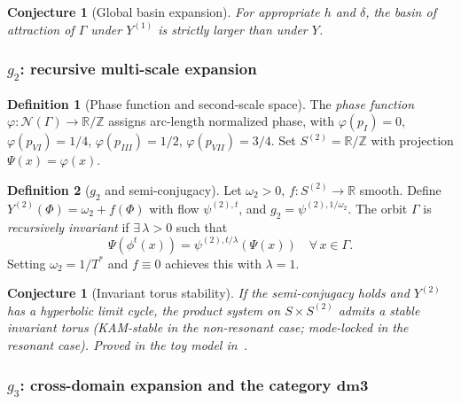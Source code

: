 \documentclass[12pt, oneside]{book}
\theoremstyle{plain}
\newtheorem{conjecture}[theorem]{Conjecture}
\theoremstyle{definition}
\newtheorem{definition}{Definition}[section]
\theoremstyle{remark}
\newcommand{\R}{\mathbb{R}}
\newcommand{\dmcat}{\mathbf{dm3}}
\newcommand{\Orb}{\Gamma}
\newcommand{\cN}{\mathcal{N}}
\begin{document}
\begin{conjecture}[Global basin expansion]\label{conj:global}
For appropriate $h$ and $\delta$, the basin of attraction of $\Orb$
under $Y^{(1)}$ is strictly larger than under $Y$.
\end{conjecture}

\subsubsection{\texorpdfstring{$g_2$}{g2}: recursive multi-scale expansion}

\begin{definition}[Phase function and second-scale space]\label{def:phase}
The \emph{phase function} $\varphi\colon\cN(\Orb)\to\R/\mathbb{Z}$
assigns arc-length normalized phase, with $\varphi(p_I)=0$,
$\varphi(p_{VI})=1/4$, $\varphi(p_{III})=1/2$,
$\varphi(p_{VII})=3/4$. Set $S^{(2)}=\R/\mathbb{Z}$ with
projection $\Psi(x)=\varphi(x)$.
\end{definition}

\begin{definition}[$g_2$ and semi-conjugacy]\label{def:g2}
Let $\omega_2>0$, $f\colon S^{(2)}\to\R$ smooth. Define
$Y^{(2)}(\Phi)=\omega_2+f(\Phi)$ with flow $\psi^{(2),t}$, and
$g_2=\psi^{(2),1/\omega_2}$. The orbit $\Orb$ is
\emph{recursively invariant} if $\exists\,\lambda>0$ such that
\[
  \Psi(\phi^t(x)) = \psi^{(2),t/\lambda}(\Psi(x))
  \quad\forall\,x\in\Orb.
\]
Setting $\omega_2=1/T^*$ and $f\equiv 0$ achieves this with $\lambda=1$.
\end{definition}

\begin{conjecture}[Invariant torus stability]\label{conj:torus}
If the semi-conjugacy holds and $Y^{(2)}$ has a hyperbolic limit cycle,
the product system on $S\times S^{(2)}$ admits a stable invariant torus
(KAM-stable in the non-resonant case; mode-locked in the resonant case).
Proved in the toy model in~\cite{Paper2}.
\end{conjecture}

\subsubsection{\texorpdfstring{$g_3$}{g3}: cross-domain expansion and the category \texorpdfstring{$\dmcat$}{dm3}}
\end{document}
